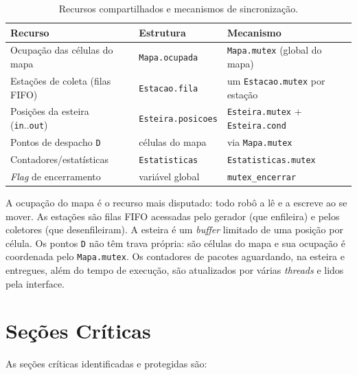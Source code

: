 \documentclass[12pt]{article}
\begin{document}
\begin{table}[ht]
\centering
\caption{Recursos compartilhados e mecanismos de sincronização.}
\label{tab:recursos}
\footnotesize
\setlength{\tabcolsep}{4pt}
\begin{tabular}{lll}
\hline
\textbf{Recurso} & \textbf{Estrutura} & \textbf{Mecanismo} \\
\hline
Ocupação das células do mapa & \texttt{Mapa.ocupada} & \texttt{Mapa.mutex} (global do mapa) \\
Estações de coleta (filas FIFO) & \texttt{Estacao.fila} & um \texttt{Estacao.mutex} por estação \\
Posições da esteira (\texttt{in}..\texttt{out}) & \texttt{Esteira.posicoes} & \texttt{Esteira.mutex} + \texttt{Esteira.cond} \\
Pontos de despacho \texttt{D} & células do mapa & via \texttt{Mapa.mutex} \\
Contadores/estatísticas & \texttt{Estatisticas} & \texttt{Estatisticas.mutex} \\
\textit{Flag} de encerramento & variável global & \texttt{mutex\_encerrar} \\
\hline
\end{tabular}
\end{table}

A ocupação do mapa é o recurso mais disputado: todo robô a lê e a escreve ao se
mover. As estações são filas FIFO acessadas pelo gerador (que enfileira) e pelos
coletores (que desenfileiram). A esteira é um \textit{buffer} limitado de uma
posição por célula. Os pontos \texttt{D} não têm trava própria: são células do
mapa e sua ocupação é coordenada pelo \texttt{Mapa.mutex}. Os contadores de
pacotes aguardando, na esteira e entregues, além do tempo de execução, são
atualizados por várias \textit{threads} e lidos pela interface.

\section{Seções Críticas}

As seções críticas identificadas e protegidas são:
\end{document}
